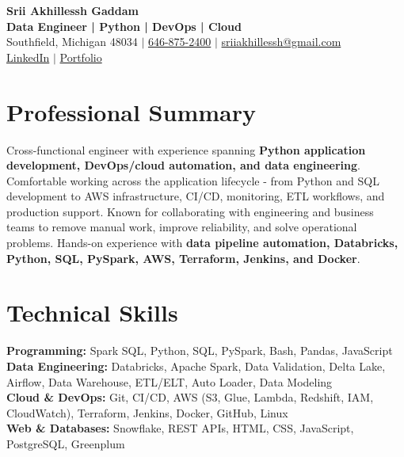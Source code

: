 \documentclass[letterpaper,10pt]{article}
\begin{document}
\fontsize{9.35pt}{10.45pt}\selectfont

\begin{center}
    {\LARGE \textbf{Srii Akhillessh Gaddam}} \\[-1pt]
    \textbf{Data Engineer | Python | DevOps | Cloud} \\[2pt]
    Southfield, Michigan 48034 $|$
    \href{tel:6468752400}{646-875-2400} $|$
    \href{mailto:sriiakhillessh@gmail.com}{sriiakhillessh@gmail.com} \\[1pt]
    \href{https://www.linkedin.com/in/srii-akhiilessh-gaddam-b48668191/}{LinkedIn} $|$
    \href{https://sriiakhillesshg.github.io/portfolio/}{Portfolio}
\end{center}
\vspace{-8pt}

\section{Professional Summary}
\small{Cross-functional engineer with experience spanning \textbf{Python application development, DevOps/cloud automation, and data engineering}. Comfortable working across the application lifecycle - from Python and SQL development to AWS infrastructure, CI/CD, monitoring, ETL workflows, and production support. Known for collaborating with engineering and business teams to remove manual work, improve reliability, and solve operational problems. Hands-on experience with \textbf{data pipeline automation, Databricks, Python, SQL, PySpark, AWS, Terraform, Jenkins, and Docker}.}

\section{Technical Skills}
\small{
\textbf{Programming:} Spark SQL, Python, SQL, PySpark, Bash, Pandas, JavaScript \\
\textbf{Data Engineering:} Databricks, Apache Spark, Data Validation, Delta Lake, Airflow, Data Warehouse, ETL/ELT, Auto Loader, Data Modeling \\
\textbf{Cloud \& DevOps:} Git, CI/CD, AWS (S3, Glue, Lambda, Redshift, IAM, CloudWatch), Terraform, Jenkins, Docker, GitHub, Linux \\
\textbf{Web \& Databases:} Snowflake, REST APIs, HTML, CSS, JavaScript, PostgreSQL, Greenplum
}
\end{document}
